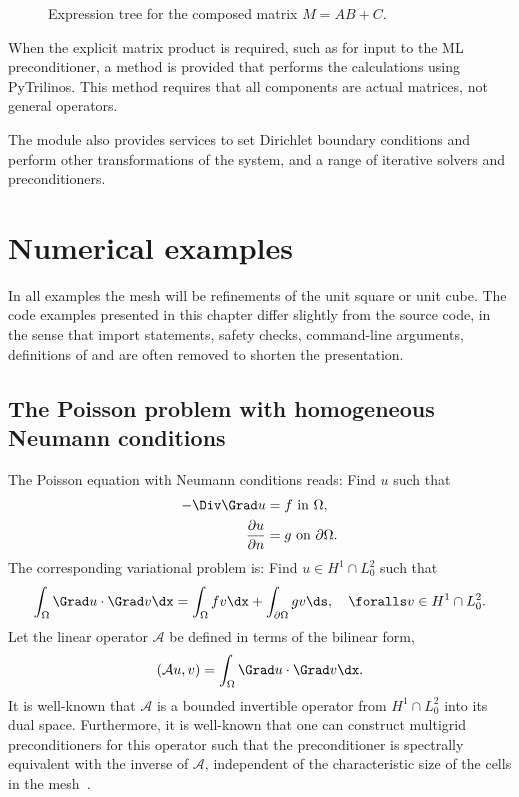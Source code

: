 \begin{figure}
  \centering
  \caption{Expression tree for the composed matrix $M = A B + C$.}
  \label{fig:mardal-4:block:dag}
  \vspace*{-1pc}
\end{figure}

When the explicit matrix product is required, such as for input to the
ML preconditioner, a method  is provided that performs
the calculations using PyTrilinos. This method requires that all
components are actual matrices, not general operators.

The module also provides services to set Dirichlet boundary conditions
and perform other transformations of the system, and a range of
iterative solvers and preconditioners.

\section{Numerical examples}

In all examples the mesh will be refinements of the unit square or
unit cube.  The code examples presented in this chapter differ
slightly from the source code, in the sense that import statements,
safety checks, command-line arguments, definitions of 
and  are often removed to shorten the presentation.

\subsection{The Poisson problem with homogeneous Neumann conditions}
The Poisson equation with Neumann conditions reads:
Find $u$ such that
\begin{align}
  -\Div \Grad u &= f \mbox{ in } \Omega,  \\
  \frac{\partial u}{\partial n} &= g \mbox{ on } \partial \Omega .
\end{align}
The corresponding variational problem is:  Find $u\in H^1 \cap L^2_0$ such that
\[
\int_\Omega \Grad u \cdot \Grad v \dx = \int_\Omega f v \dx +
\int_{\partial \Omega} g v  \ds, \quad\foralls v \in H^1 \cap L^2_0 .
\]
Let the linear operator $\mathcal{A}$ be defined in terms of the  bilinear form,
\[
(\mathcal{A} u, v) =  \int_\Omega \Grad u \cdot \Grad v \dx.
\]
It is well-known that $\mathcal{A}$ is a bounded invertible operator
from $H^1 \cap L^2_0$ into its dual space.  Furthermore, it is
well-known that one can construct multigrid preconditioners for this
operator such that the preconditioner is spectrally equivalent with
the inverse of $\mathcal{A}$, independent of the characteristic size
of the cells in the
mesh~\citep{Bramble1993,Hackbusch1994,TrottenbergOosterleeSchuller2001}.


